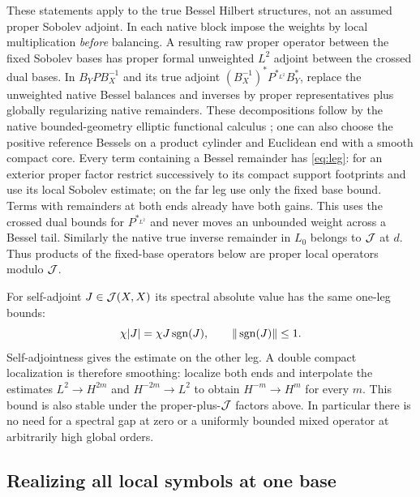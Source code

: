 These statements apply to the true Bessel Hilbert structures, not an assumed proper Sobolev adjoint. In each native block impose the weights by local multiplication \emph{before} balancing. A resulting raw proper operator between the fixed Sobolev bases has proper formal unweighted \(L^2\) adjoint between the crossed dual bases. In \(B_Y P B_X^{-1}\) and its true adjoint \((B_X^{-1})^*P^{*_{L^2}}B_Y^*\), replace the unweighted native Bessel balances and inverses by proper representatives plus globally regularizing native remainders. These decompositions follow by the native bounded-geometry elliptic functional calculus \cite[Thm.~5.12]{GOW}; one can also choose the positive reference Bessels on a product cylinder and Euclidean end with a smooth compact core. Every term containing a Bessel remainder has \eqref{eq:leg}: for an exterior proper factor restrict successively to its compact support footprints and use its local Sobolev estimate; on the far leg use only the fixed base bound. Terms with remainders at both ends already have both gains. This uses the crossed dual bounds for \(P^{*_{L^2}}\) and never moves an unbounded weight across a Bessel tail. Similarly the native true inverse remainder in \(L_0\) belongs to \(\mathcal J\) at \(d\). Thus products of the fixed-base operators below are proper local operators modulo \(\mathcal J\).

For self-adjoint \(J\in\mathcal J(X,X)\) its spectral absolute value has the same one-leg bounds:
\[
 \chi|J|=\chi J\operatorname{sgn}(J),\qquad \|\operatorname{sgn}(J)\|\leq 1.
\]
Self-adjointness gives the estimate on the other leg. A double compact localization is therefore smoothing: localize both ends and interpolate the estimates \(L^2\to H^{2m}\) and \(H^{-2m}\to L^2\) to obtain \(H^{-m}\to H^m\) for every \(m\). This bound is also stable under the proper-plus-\(\mathcal J\) factors above. In particular there is no need for a spectral gap at zero or a uniformly bounded mixed operator at arbitrarily high global orders.

\subsection{Realizing all local symbols at one base}\label{sec:factorend}

